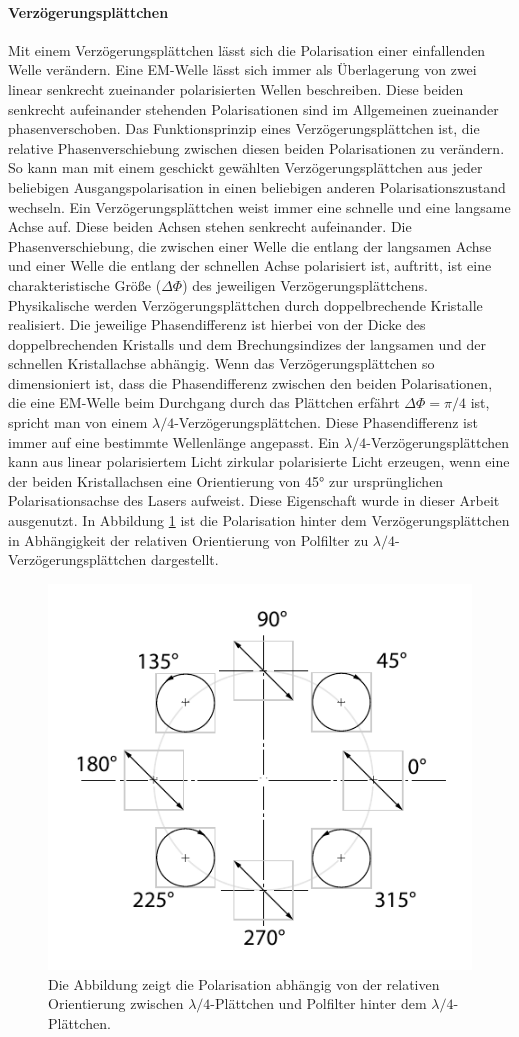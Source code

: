 \documentclass[titlepage]{article}
\begin{document}
	\paragraph{Verzögerungsplättchen}
		Mit einem Verzögerungsplättchen lässt sich die Polarisation einer einfallenden Welle verändern. Eine EM-Welle lässt sich immer als Überlagerung von zwei linear senkrecht zueinander polarisierten Wellen beschreiben. Diese beiden senkrecht aufeinander stehenden Polarisationen sind im Allgemeinen zueinander phasenverschoben. Das Funktionsprinzip eines Verzögerungsplättchen ist, die relative Phasenverschiebung zwischen diesen beiden Polarisationen zu verändern. So kann man mit einem geschickt gewählten Verzögerungsplättchen aus jeder beliebigen Ausgangspolarisation in einen beliebigen anderen Polarisationszustand wechseln. Ein Verzögerungsplättchen weist immer eine schnelle und eine langsame Achse auf. Diese beiden Achsen stehen senkrecht aufeinander. Die Phasenverschiebung, die zwischen einer Welle die entlang der langsamen Achse und einer Welle die entlang der schnellen Achse polarisiert ist, auftritt, ist eine charakteristische Größe ($\Delta\Phi$) des jeweiligen Verzögerungsplättchens. Physikalische werden Verzögerungsplättchen durch doppelbrechende Kristalle realisiert. Die jeweilige Phasendifferenz ist hierbei von der Dicke des doppelbrechenden Kristalls und dem Brechungsindizes der langsamen und der schnellen Kristallachse abhängig. Wenn das Verzögerungsplättchen so dimensioniert ist, dass die Phasendifferenz zwischen den beiden Polarisationen, die eine EM-Welle beim Durchgang durch das Plättchen erfährt $\Delta \Phi = \pi /4 $ ist, spricht man von einem  $\lambda /4$-Verzögerungsplättchen. Diese Phasendifferenz ist immer auf eine bestimmte Wellenlänge angepasst.  Ein $\lambda /4$-Verzögerungsplättchen kann aus linear polarisiertem Licht zirkular polarisierte Licht erzeugen, wenn eine der beiden Kristallachsen eine Orientierung von 45° zur ursprünglichen Polarisationsachse des Lasers aufweist. Diese Eigenschaft wurde in dieser Arbeit ausgenutzt. In Abbildung \ref{fig:polarisationlambda} ist die Polarisation hinter dem Verzögerungsplättchen in Abhängigkeit der relativen Orientierung von Polfilter zu $\lambda /4$-Verzögerungsplättchen dargestellt. 
		\begin{figure}
			\centering
			\includegraphics[width=0.5\linewidth]{figures/Polarisation_lambda}
			\caption{Die Abbildung zeigt die Polarisation abhängig von der relativen Orientierung zwischen $\lambda/4$-Plättchen und Polfilter hinter dem $\lambda/4$-Plättchen.}
			\label{fig:polarisationlambda}
		\end{figure}
		
\end{document}
